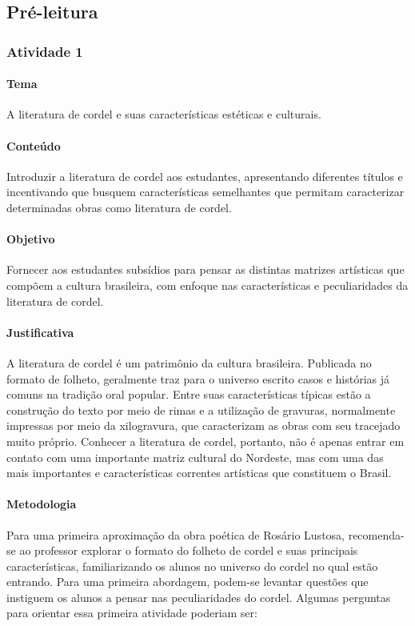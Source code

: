 \documentclass[11pt]{extarticle}
\begin{document}
\subsection{Pré-leitura}

\subsubsection{Atividade 1}


\paragraph{Tema} A literatura de cordel e suas características estéticas e culturais.

\paragraph{Conteúdo} Introduzir a literatura de cordel aos estudantes, apresentando diferentes títulos e incentivando que busquem características semelhantes que permitam caracterizar determinadas obras como literatura de cordel.

\paragraph{Objetivo} Fornecer aos estudantes subsídios para pensar as distintas matrizes artísticas que compõem a cultura brasileira, com enfoque nas características e peculiaridades da literatura de cordel.

\paragraph{Justificativa} A literatura de cordel é um patrimônio da cultura brasileira. Publicada no formato de folheto, geralmente traz para o universo escrito casos e histórias já comuns na tradição oral popular. Entre suas características típicas estão a construção do texto por meio de rimas e a utilização de gravuras, normalmente impressas por meio da xilogravura, que caracterizam as obras com seu tracejado muito próprio. Conhecer a literatura de cordel, portanto, não é apenas entrar em contato com uma importante matriz cultural do Nordeste, mas com uma das mais importantes e características correntes artísticas que constituem o Brasil.

\paragraph{Metodologia} Para uma primeira aproximação da obra poética de Rosário Lustosa, recomenda-se ao professor explorar o formato do folheto de cordel e suas principais características, familiarizando os alunos no universo do cordel no qual estão entrando. 
Para uma primeira abordagem, podem-se levantar questões que instiguem os alunos a pensar nas peculiaridades do cordel.
Algumas perguntas para orientar essa primeira atividade poderiam ser:
\end{document}
